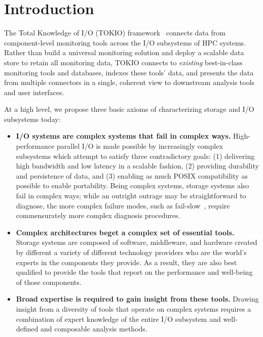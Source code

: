 \section{Introduction} \label{sec:intro}

The Total Knowledge of I/O (TOKIO) framework~\cite{Lockwood2017} connects data from component-level monitoring tools across the I/O subsystems of HPC systems.  Rather than build a universal monitoring solution and deploy a scalable data store to retain all monitoring data, TOKIO connects to \emph{existing} best-in-class monitoring tools and databases, indexes these tools' data, and presents the data from multiple connectors in a single, coherent view to downstream analysis tools and user interfaces.

At a high level, we propose three basic axioms of characterizing storage and I/O subsystems today:

\begin{itemize}[leftmargin=*]
\item \textbf{I/O systems are complex systems that fail in complex ways.}
High-performance parallel I/O is made possible by increasingly complex subsystems which attempt to satisfy three contradictory goals:
(1) delivering high bandwidth and low latency in a scalable fashion,
(2) providing durability and persistence of data, and
(3) enabling as much POSIX compatibility as possible to enable portability.
Being complex systems, storage systems also fail in complex ways;
while an outright outrage may be straightforward to diagnose, the more complex failure modes, such as fail-slow~\cite{Gunawi2018}, require commensurately more complex diagnosis procedures.

\item \textbf{Complex architectures beget a complex set of essential tools.}
Storage systems are composed of software, middleware, and hardware created by different a variety of different technology providers who are the world's experts in the components they provide.
As a result, they are also best qualified to provide the tools that report on the performance and well-being of those components.

\item \textbf{Broad expertise is required to gain insight from these tools.}
Drawing insight from a diversity of tools that operate on complex systems requires a combination of expert knowledge of the entire I/O subsystem and well-defined and composable analysis methods.
\end{itemize}

